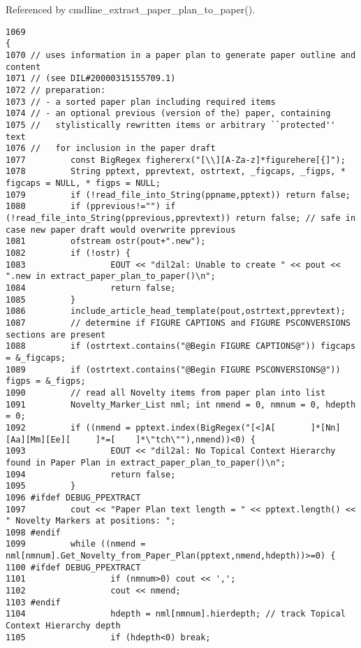 Referenced by cmdline\_\-extract\_\-paper\_\-plan\_\-to\_\-paper().



\footnotesize\begin{verbatim}1069                                                                                {
1070 // uses information in a paper plan to generate paper outline and content
1071 // (see DIL#20000315155709.1)
1072 // preparation:
1073 // - a sorted paper plan including required items
1074 // - an optional previous (version of the) paper, containing
1075 //   stylistically rewritten items or arbitrary ``protected'' text
1076 //   for inclusion in the paper draft
1077         const BigRegex fighererx("[\\][A-Za-z]*figurehere[{]");
1078         String pptext, pprevtext, ostrtext, _figcaps, _figps, * figcaps = NULL, * figps = NULL;
1079         if (!read_file_into_String(ppname,pptext)) return false;
1080         if (pprevious!="") if (!read_file_into_String(pprevious,pprevtext)) return false; // safe in case new paper draft would overwrite pprevious
1081         ofstream ostr(pout+".new");
1082         if (!ostr) {
1083                 EOUT << "dil2al: Unable to create " << pout << ".new in extract_paper_plan_to_paper()\n";
1084                 return false;
1085         }
1086         include_article_head_template(pout,ostrtext,pprevtext);
1087         // determine if FIGURE CAPTIONS and FIGURE PSCONVERSIONS sections are present
1088         if (ostrtext.contains("@Begin FIGURE CAPTIONS@")) figcaps = &_figcaps;
1089         if (ostrtext.contains("@Begin FIGURE PSCONVERSIONS@")) figps = &_figps;
1090         // read all Novelty items from paper plan into list
1091         Novelty_Marker_List nml; int nmend = 0, nmnum = 0, hdepth = 0;
1092         if ((nmend = pptext.index(BigRegex("[<]A[       ]*[Nn][Aa][Mm][Ee][     ]*=[    ]*\"tch\""),nmend))<0) {
1093                 EOUT << "dil2al: No Topical Context Hierarchy found in Paper Plan in extract_paper_plan_to_paper()\n";
1094                 return false;
1095         }
1096 #ifdef DEBUG_PPEXTRACT
1097         cout << "Paper Plan text length = " << pptext.length() << " Novelty Markers at positions: ";
1098 #endif
1099         while ((nmend = nml[nmnum].Get_Novelty_from_Paper_Plan(pptext,nmend,hdepth))>=0) {
1100 #ifdef DEBUG_PPEXTRACT
1101                 if (nmnum>0) cout << ',';
1102                 cout << nmend;
1103 #endif
1104                 hdepth = nml[nmnum].hierdepth; // track Topical Context Hierarchy depth
1105                 if (hdepth<0) break;

\end{verbatim}
